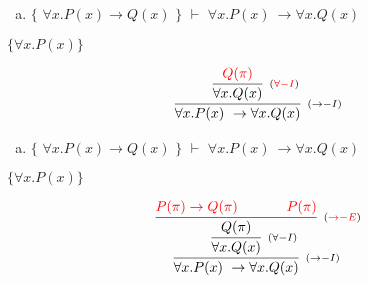 \documentclass[aspectratio=43]{beamer}
\begin{document}
    \begin{frame}[fragile]
    
    	\begin{enumerate}[f)]
			\item $\{$ $\forall x.P(x)\to Q(x) $ $\}$ $\vdash$ $ \forall x.P(x)\ \to \forall x.Q(x) $ \\
		\end{enumerate}
        $ \{\forall x.P(x)\} $
        \vspace{55pt}
        
        \[
        \begin{array}{c}
		
        	\infer[_{(\to -I)}]
            	{\forall x.P(x)\ \to \forall x.Q(x)}
            	{\infer[_{(\textcolor{red}{\forall -I})}] 
                	{\forall x.Q(x)}
                    {\textcolor{red}{Q(\pi)}}
                 }   
        
		\end{array}
        \]
        
	\end{frame}
    
    \begin{frame}[fragile]
    
    	\begin{enumerate}[f)]
			\item $\{$ $\forall x.P(x)\to Q(x) $ $\}$ $\vdash$ $ \forall x.P(x)\ \to \forall x.Q(x) $ \\
		\end{enumerate}
        $ \{\forall x.P(x)\} $
        \vspace{50pt}
        
        \[
        \begin{array}{c}
		
        	\infer[_{(\to -I)}]
            	{\forall x.P(x)\ \to \forall x.Q(x)}
            	{\infer[_{(\forall -I)}] 
                	{\forall x.Q(x)}
                    {\infer[_{(\textcolor{red}{\to -E})}]
                    	{Q(\pi)}
                        {\textcolor{red}{P(\pi)\rightarrow Q(\pi) \hspace{35pt} P(\pi)}}
                    }
                 }   
        
		\end{array}
        \]
        
	\end{frame}
    
\end{document}
